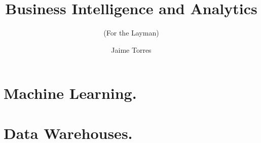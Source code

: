 \documentclass{textbook}
\title     {Business Intelligence and Analytics}
\subtitle  {(For the Layman)}
\author    {Jaime Torres}
\begin{document}
\tableofcontents

\part{Machine Learning.}



\part{Data Warehouses.}
\end{document}
